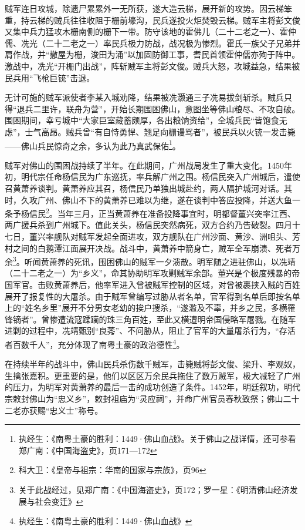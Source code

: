贼军连日攻城，除遗尸累累外一无所获，遂大造云梯，展开新的攻势。因云梯笨重，持云梯的贼兵往往收阻于栅前壕沟，民兵遂投火炬焚毁云梯。贼军主将彭文俊又集中兵力猛攻木栅南侧的栅下一带。防守该地的霍佛儿（二十二老之一）、霍仲儒、冼光（二十二老之一）率民兵极力防战，战况极为惨烈。霍氏一族父子兄弟并肩作战，并“撤屋为栅，浚田为涌”以加固防御工事，耆民首领霍仲儒亦殉于阵中。激战中，冼光“开栅门出战”，阵斩贼军主将彭文俊。贼兵大怒，攻城益急，结果被民兵用“飞枪巨铳”击退。

无计可施的贼军派使者李某入城劝降，结果被冼灏通三子冼易拔剑斩杀。贼兵只得“退兵二里许，联舟为营”，开始长期围困佛山，意图坐等佛山粮尽、不攻自破。围困期间，幸亏城中“大家巨室藏蓄颇厚，各出粮饷资给”，全城兵民“皆饱食无虑”，士气高昂。贼兵曾“有自恃勇悍、翘足向栅谩骂者”，被民兵以火铳一发击毙——佛山兵民惊奇之余，多认为此乃真武保佑\footnote{执经生：《南粤土豪的胜利：1449·佛山血战》。关于佛山之战详情，还可参看郑广南：《中国海盗史》，页171—172}。

贼军对佛山的围困战持续了半年。在此期间，广州战局发生了重大变化。1450年初，明代宗任命杨信民为广东巡抚，率兵解广州之围。杨信民突入广州城后，遣使召黄萧养谈判。黄萧养应其召，杨信民乃单独出城赴约，两人隔护城河对话。其时，久攻广州、佛山不下的黄萧养已难以为继，遂在谈判中答应投降，并送大鱼一条予杨信民\footnote{科大卫：《皇帝与祖宗：华南的国家与宗族》，页96}。当年三月，正当黄萧养在准备投降事宜时，明都督董兴突率江西、两广援兵杀到广州城下。值此关头，杨信民突然病死，双方合约乃告破裂。四月十七日，董兴率舰队对贼军发起全面进攻，双方舰队在广州沙面、黄沙、洲咀头、芳村之间的白鹅潭江面展开决战。战斗中，黄萧养中箭身亡，贼军全军崩溃、死者万余\footnote{关于此战经过，见郑广南：《中国海盗史》，页172；罗一星：《明清佛山经济发展与社会变迁》}。听闻黄萧养的死讯，围困佛山的贼军一夕溃散。明军随之进驻佛山，以冼靖（二十二老之一）为“乡义”，命其协助明军攻剿贼军余部。董兴是个极度残暴的帝国军官。击败黄萧养后，他率军进入曾被贼军控制的区域，对曾被裹挟入贼的百姓展开了报复性的大屠杀。由于贼军曾编写过胁从者名单，官军得到名单后即按名单上的“姓名乡里”展开不分男女老幼的挨户搜杀，“遂滥及不辜，并乡之民，多横罹锋镝者”。曾惨遭流寇蹂躏的珠三角百姓，至此又横遭明帝国侵略军屠戮。在随军进剿的过程中，冼靖甄别“良莠”、不问胁从，阻止了官军的大量屠杀行为，“存活者百数千人”，充分体现了南粤土豪的政治德性\footnote{执经生：《南粤土豪的胜利：1449·佛山血战》}。

在持续半年的战斗中，佛山民兵杀伤数千贼军，击毙贼将彭文俊、梁升、李观奴，生擒张嘉积。更重要的是，他们以区区万余民兵拖住了数万贼军，极大减轻了广州的压力，为明军对黄萧养的最后一击的成功创造了条件。1452年，明廷叙功，明代宗敕封佛山为“忠义乡”，敕封祖庙为“灵应祠”，并命广州官员春秋致祭；佛山二十二老亦获赐“忠义士”称号。


